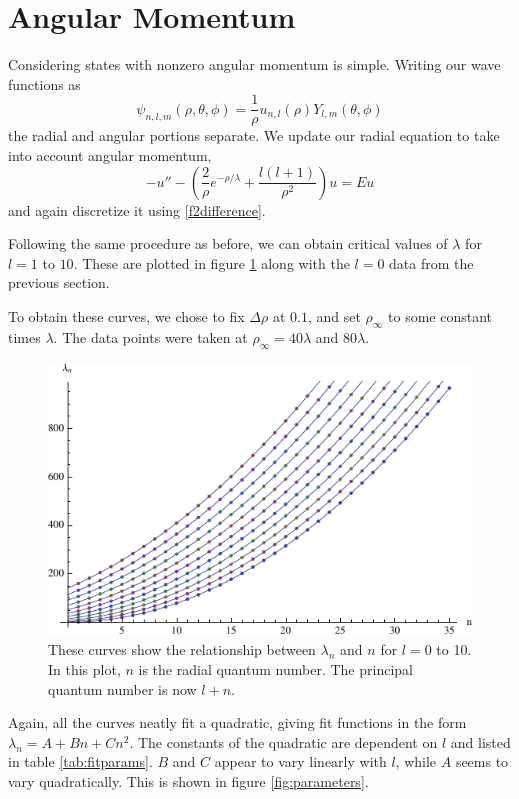 \documentclass[12pt,twoside]{reedthesis}
\newcommand{\eqn}[1]{\begin{equation}#1\end{equation}}
\begin{document}
\section{Angular Momentum}

Considering states with nonzero angular momentum is simple. Writing our wave functions as
\eqn{
\psi_{n,l,m} (\rho,\theta,\phi) = \frac{1}{\rho}u_{n,l}(\rho) Y_{l,m}(\theta, \phi)
}
the radial and angular portions separate. We update our radial equation to take into account angular momentum,
\eqn{
-u'' - \left(\frac{2}{\rho}e^{-\rho/\lambda} + \frac{l(l+1)}{\rho^2}\right) u = E u
\label{eq:angmomentum}
}
and again discretize it using \eqref{f2difference}. 

Following the same procedure as before, we can obtain critical values of $\lambda$ for $l = 1$ to $10$. These are plotted in figure \ref{fig:allthelcs} along with the $l = 0$ data from the previous section.

To obtain these curves, we chose to fix $\Delta \rho$ at $0.1$, and set $\rho_{\infty}$ to some constant times $\lambda$. The data points were taken at $\rho_{\infty} = 40 \lambda$ and $80 \lambda$.

\begin{figure}[h]
\centering
\includegraphics{Figures/allthelcs}
\caption[Plots of $\lambda_n$ versus $n$ for $l = 0$ to $10$]{These curves show the relationship between $\lambda_n$ and $n$ for $l = 0$ to 10. In this plot, $n$ is the radial quantum number. The principal quantum number is now $l + n$.}
\label{fig:allthelcs}
\end{figure}

Again, all the curves neatly fit a quadratic, giving fit functions in the form $\lambda_n = A + B n + C n^2$. The constants of the quadratic are dependent on $l$ and listed in table \ref{tab:fitparams}. $B$ and $C$ appear to vary linearly with $l$, while $A$ seems to vary quadratically. This is shown in figure \ref{fig:parameters}.
\end{document}

